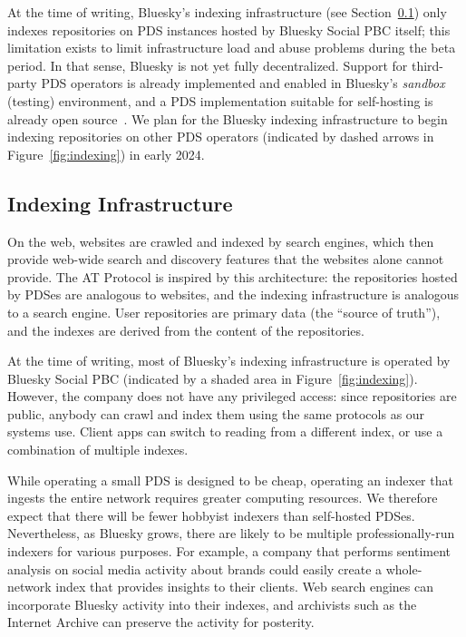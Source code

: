 \documentclass[sigconf,nonacm]{acmart}
\begin{document}
At the time of writing, Bluesky's indexing infrastructure (see Section~\ref{sec:indexing}) only indexes repositories on PDS instances hosted by Bluesky Social PBC itself; this limitation exists to limit infrastructure load and abuse problems during the beta period.
In that sense, Bluesky is not yet fully decentralized.
Support for third-party PDS operators is already implemented and enabled in Bluesky's \emph{sandbox} (testing) environment, and a PDS implementation suitable for self-hosting is already open source~\cite{BlueskyGithub}.
We plan for the Bluesky indexing infrastructure to begin indexing repositories on other PDS operators (indicated by dashed arrows in Figure~\ref{fig:indexing}) in early 2024.

\subsection{Indexing Infrastructure}\label{sec:indexing}

On the web, websites are crawled and indexed by search engines, which then provide web-wide search and discovery features that the websites alone cannot provide.
The AT Protocol is inspired by this architecture: the repositories hosted by PDSes are analogous to websites, and the indexing infrastructure is analogous to a search engine.
User repositories are primary data (the ``source of truth''), and the indexes are derived from the content of the repositories.

At the time of writing, most of Bluesky's indexing infrastructure is operated by Bluesky Social PBC (indicated by a shaded area in Figure~\ref{fig:indexing}).
However, the company does not have any privileged access: since repositories are public, anybody can crawl and index them using the same protocols as our systems use.
Client apps can switch to reading from a different index, or use a combination of multiple indexes.

While operating a small PDS is designed to be cheap, operating an indexer that ingests the entire network requires greater computing resources.
We therefore expect that there will be fewer hobbyist indexers than self-hosted PDSes.
Nevertheless, as Bluesky grows, there are likely to be multiple professionally-run indexers for various purposes.
For example, a company that performs sentiment analysis on social media activity about brands could easily create a whole-network index that provides insights to their clients.
Web search engines can incorporate Bluesky activity into their indexes, and archivists such as the Internet Archive can preserve the activity for posterity.
\end{document}
